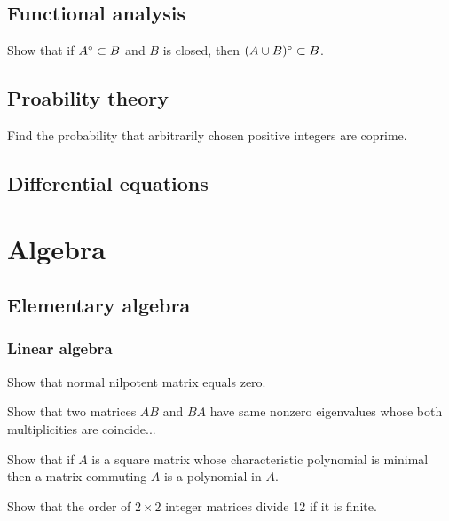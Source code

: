 \documentclass[11pt]{report}
\let\realsection\section
\renewcommand\section{\realsection}
\begin{document}
\section{Functional analysis}
\begin{cond}
\item Show that if $A^\o\subset B$ and $B$ is closed, then $(A\cup B)^\o\subset B$.
\end{cond}

\section{Proability theory}
\begin{cond}
\item Find the probability that arbitrarily chosen positive integers are coprime.
\end{cond}

\section{Differential equations}












\chapter{Algebra}

\section{Elementary algebra}

\subsection{Linear algebra}
\begin{cond}
\item Show that normal nilpotent matrix equals zero.
\item Show that two matrices $AB$ and $BA$ have same nonzero eigenvalues whose both multiplicities are coincide...
\item Show that if $A$ is a square matrix whose characteristic polynomial is minimal then a matrix commuting $A$ is a polynomial in $A$.
\item Show that the order of $2\times 2$ integer matrices divide 12 if it is finite.
\end{cond}
\end{document}

